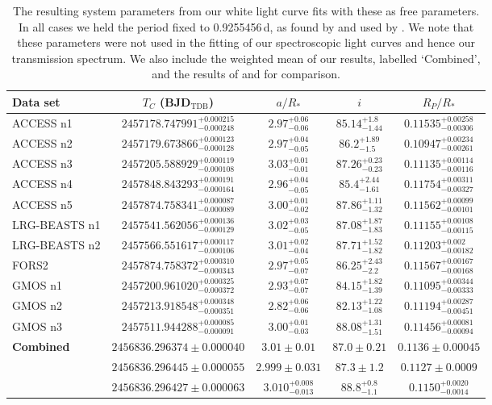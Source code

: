 \documentclass[twocolumn]{aastex63}
\begin{document}
\begin{table*}
\centering
\caption{The resulting system parameters from our white light curve fits with these as free parameters. In all cases we held the period fixed to 0.9255456\,d, as found by \protect\cite{Southworth2015} and used by \protect\cite{Kreidberg2018}. We note that these parameters were not used in the fitting of our spectroscopic light curves and hence our transmission spectrum. We also include the weighted mean of our results, labelled `Combined', and the results of \protect\cite{Southworth2015} and \protect\cite{Delrez2018} for comparison.}
\label{tab:r_system_parameters}
\begin{tabular}{lcccc} \hline
Data set & $T_C$ (BJD$_\mathrm{TDB}$) & $a/R_*$ & $i$ & $R_{P}/R_*$ \\ \hline\hline

ACCESS n1 &  $2457178.747991^{+0.000215}_{-0.000248}$ & $2.97^{+0.06}_{-0.06}$ & $85.14^{+1.8}_{-1.44}$ & $0.11535^{+0.00258}_{-0.00306}$
\\
ACCESS n2 & $2457179.673866^{+0.000123}_{-0.000128}$ & $2.97^{+0.04}_{-0.05}$ & $86.2^{+1.89}_{-1.5}$ & $0.10947^{+0.00234}_{-0.00261}$
 \\
ACCESS n3 & $2457205.588929^{+0.000119}_{-0.000108}$ & $3.03^{+0.01}_{-0.01}$ & $87.26^{+0.23}_{-0.23}$ & $0.11135^{+0.00114}_{-0.00116}$
 \\
ACCESS n4  & $2457848.843293^{+0.000191}_{-0.000164}$ & $2.96^{+0.04}_{-0.05}$ & $85.4^{+2.44}_{-1.61}$ & $0.11754^{+0.00311}_{-0.00327}$
 \\
ACCESS n5 & $2457874.758341^{+0.000087}_{-0.000089}$ & $3.00^{+0.01}_{-0.02}$ & $87.86^{+1.11}_{-1.32}$ & $0.11562^{+0.00099}_{-0.00101}$
 \\ 
LRG-BEASTS n1 & $2457541.562056^{+0.000136}_{-0.000129}$ & $3.02^{+0.03}_{-0.05}$ & $87.08^{+1.87}_{-1.83}$ & $0.11155^{+0.00108}_{-0.00115}$
 \\
LRG-BEASTS n2  & $2457566.551617^{+0.000117}_{-0.000106}$ & $3.01^{+0.02}_{-0.04}$ & $87.71^{+1.52}_{-1.82}$ & $0.11203^{+0.002}_{-0.00182}$
\\
FORS2 &  $2457874.758372^{+0.000310}_{-0.000343}$ & $2.97^{+0.05}_{-0.07}$ & $86.25^{+2.43}_{-2.2}$ & $0.11567^{+0.00167}_{-0.00168}$
\\
GMOS n1 & $2457200.961020^{+0.000325}_{-0.000372}$ & $2.93^{+0.07}_{-0.07}$ & $84.15^{+1.82}_{-1.39}$ & $0.11095^{+0.00344}_{-0.00333}$
\\
GMOS n2 & $2457213.918548^{+0.000348}_{-0.000351}$ & $2.82^{+0.06}_{-0.06}$ & $82.13^{+1.22}_{-1.08}$ & $0.11194^{+0.00287}_{-0.00451}$
\\
GMOS n3 & $2457511.944288^{+0.000085}_{-0.000091}$ & $3.00^{+0.01}_{-0.03}$ & $88.08^{+1.31}_{-1.51}$ & $0.11456^{+0.00081}_{-0.00094}$
\\ \hline
\textbf{Combined} & $2456836.296374 \pm 0.000040$ & $3.01 \pm 0.01$ & $87.0 \pm 0.21$ & $0.1136 \pm 0.00045$
\\
\protect\cite{Southworth2015} & $2456836.296445 \pm 0.000055$ & $2.999 \pm 0.031$  & $87.3 \pm 1.2$ & $0.1127 \pm 0.0009$\\
\protect\cite{Delrez2018} & $2456836.296427 \pm 0.000063$ & $3.010^{+0.008}_{-0.013}$ & $88.8^{+0.8}_{-1.1}$ &  $0.1150^{+0.0020}_{-0.0014}$ 


\end{tabular}
\end{table*}
\end{document}
